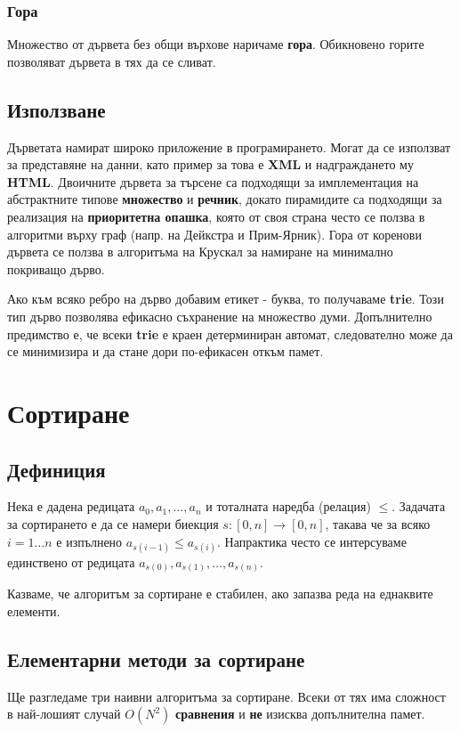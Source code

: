 \documentclass[fleqn,12pt]{article}
\begin{document}
\subsubsection{Гора}
Множество от дървета без общи върхове наричаме \textbf{гора}. Обикновено горите позволяват дървета в тях да се сливат.

\subsection{Използване}
Дърветата намират широко приложение в програмирането. Могат да се използват за представяне на данни, като пример за това е \textbf{XML}
и надграждането му \textbf{HTML}. Двоичните дървета за търсене са подходящи за имплементация на абстрактните типове \textbf{множество} и \textbf{речник},
докато пирамидите са подходящи за реализация на \textbf{приоритетна опашка}, която от своя страна често се ползва в алгоритми върху граф (напр. на Дейкстра и Прим-Ярник).
Гора от коренови дървета се ползва в алгоритъма на Крускал за намиране на минимално покриващо дърво.

Ако към всяко ребро на дърво добавим етикет - буква, то получаваме \textbf{trie}. Този тип дърво позволява ефикасно съхранение на множество думи.
Допълнително предимство е, че всеки \textbf{trie} е краен детерминиран автомат, следователно може да се минимизира и да стане дори по-ефикасен откъм памет.

\section{Сортиране}
\subsection{Дефиниция}
Нека е дадена редицата $a_0, a_1, \dots, a_n$ и тоталната наредба (релация) $\leq$.
Задачата за сортирането е да се намери биекция $s : [0, n] \rightarrow [0, n]$, такава че 
за всяко $i = 1 \dots n$ е изпълнено $a_{s(i - 1)} \leq a_{s(i)}$.
Напрактика често се интерсуваме единствено от редицата $a_{s(0)}, a_{s(1)}, \dots, a_{s(n)}$.

Казваме, че алгоритъм за сортиране е стабилен, ако запазва реда на еднаквите елементи.

\subsection{Елементарни методи за сортиране}
Ще разгледаме три наивни алгоритъма за сортиране. Всеки от тях има сложност в най-лошият случай $O(N^2)$ \textbf{сравнения} 
и \textbf{не} изисква допълнителна памет.
\end{document}
